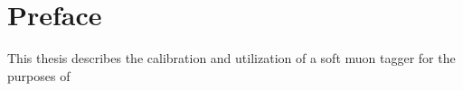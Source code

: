 \chapter*{Preface}
This thesis describes the calibration and utilization of a soft muon tagger for the purposes of 